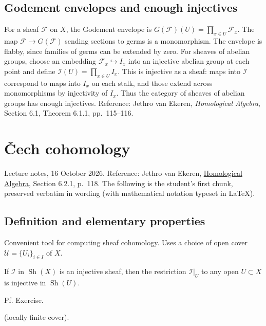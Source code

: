 \subsection{Godement envelopes and enough injectives}
\label{subsection-godement-envelopes}
For a sheaf $\mathcal F$ on $X$, the Godement envelope is
$G(\mathcal F)(U)=\prod_{x\in U}\mathcal F_x$.
The map $\mathcal F\to G(\mathcal F)$ sending sections to germs
is a monomorphism.  The envelope is flabby, since families of
germs can be extended by zero.  For sheaves of abelian groups,
choose an embedding $\mathcal F_x\hookrightarrow I_x$ into an
injective abelian group at each point and define
$\mathcal I(U)=\prod_{x\in U}I_x$.
This is injective as a sheaf: maps into $\mathcal I$ correspond
to maps into $I_x$ on each stalk, and those extend across
monomorphisms by injectivity of $I_x$.  Thus the category of
sheaves of abelian groups has enough injectives.
Reference: Jethro van Ekeren, \emph{Homological Algebra},
Section 6.1, Theorem 6.1.1, pp.~115--116.


\section{\v{C}ech cohomology}
\label{section-cech-cohomology-jethro-2026}

\noindent
Lecture notes, 16 October 2026. Reference: Jethro van Ekeren,
\href{https://w3.impa.br/~jethro/2026-2/ah-current.pdf}
{Homological Algebra}, Section 6.2.1, p.~118.
The following is the student's first chunk, preserved verbatim
in wording (with mathematical notation typeset in LaTeX).

\subsection{Definition and elementary properties}
\label{subsection-cech-definition-elementary}

\medskip
Convenient tool for computing sheaf cohomology. Uses a choice of open cover
$\mathcal U = \{U_i\}_{i\in I}$ of $X$.

\begin{lemma}
If $\mathcal I$ in $\operatorname{Sh}(X)$ is an injective sheaf, then the restriction
$\mathcal I|_U$ to any open $U\subset X$ is injective in $\operatorname{Sh}(U)$.
\end{lemma}

Pf. Exercise.

\begin{definition}
(locally finite cover).
\end{definition}

